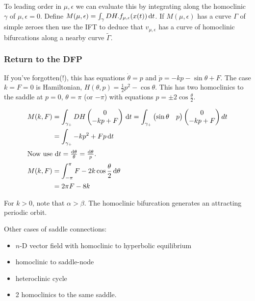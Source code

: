\documentclass{notes}
\theoremstyle{plain}
\begin{document}
To leading order in $\mu, \epsilon$ we can evaluate this by integrating
along the homoclinic $\gamma$ of $\mu, \epsilon = 0$.  Define
$M(\mu,\epsilon) = \int_\gamma DH.f_{\mu,\epsilon}(x(t))\,\mathrm{d} t$.
If $M(\mu,\epsilon)$ has a curve $\Gamma$ of simple zeroes then use
the IFT to deduce that $v_{\mu,\epsilon}$ has a curve of homoclinic
bifurcations along a nearby curve $\tilde{\Gamma}$.

\subsubsection*{Return to the DFP}

If you've forgotten(!), this has equations $\dot{\theta} = p$ and
$\dot{p} = - k p - \sin \theta + F$.  The case $k=F=0$ is Hamiltonian,
$H(\theta,p) = \frac{1}{2}p^2 - \cos \theta$.  This has two homoclinics to
the saddle at $p=0$, $\theta = \pi$ (or $-\pi$) with equations
$p = \pm 2 \cos \frac{\theta}{2}$.

\begin{align*}
M(k,F) &= \int_{\gamma_+} DH \begin{pmatrix} 0 \\ -k p + F
\end{pmatrix}\,\mathrm{d} t
= \int_{\gamma_+} \begin{pmatrix} \sin \theta & p \end{pmatrix}
\begin{pmatrix} 0 \\ -k p + F \end{pmatrix} dt \\
&= \int_{\gamma_+} -k p^2 + F p\,\mathrm{d} t \\
\intertext{Now use $\mathrm{d} t = \frac{\mathrm{d}\theta}{\theta} = \frac{\mathrm{d}\theta}{p}$.}
M(k,F) &= \int_{-\pi}^\pi F - 2 k \cos \frac{\theta}{2}\,\mathrm{d}\theta \\
&= 2 \pi F - 8 k
\end{align*}

\begin{flushright}
\parbox{2in}
{For $k >0$, note that $\alpha > \beta$.  The homoclinic bifurcation
generates an attracting periodic orbit. \vspace{0.75in}}
\end{flushright}

Other cases of saddle connections:
\begin{itemize}
\item $n$-D vector field with homoclinic to hyperbolic equilibrium
\item homoclinic to saddle-node
\item heteroclinic cycle
\item 2 homoclinics to the same saddle.
\end{itemize}
\end{document}
